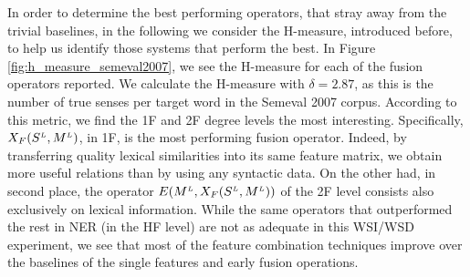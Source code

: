 In order to determine the best performing operators, that stray away from the trivial baselines, in the following we consider the H-measure, introduced before, to help us identify those systems that perform the best. In Figure \ref{fig:h_measure_semeval2007}, we see the H-measure for each of the fusion operators reported. We calculate the H-measure with $\delta=2.87$, as this is the number of true senses per target word in the Semeval 2007 corpus.  According to this metric, we find the 1F and 2F degree  levels the most interesting. Specifically, $X_F(S^{\scriptscriptstyle L},M^{\scriptscriptstyle L})$, in 1F, is the most performing fusion operator. Indeed, by transferring quality lexical similarities into its same feature matrix, we obtain more useful relations than by using any syntactic data.
On the other had, in second place, the operator $E(M^{\scriptscriptstyle L},X_F(S^{\scriptscriptstyle L},M^{\scriptscriptstyle L}))$ of the 2F level consists also exclusively on lexical information. While the same operators that outperformed the rest in NER (in the HF level) are not as adequate in this WSI/WSD experiment, we see that most of the feature combination techniques improve over the baselines of the single features and early fusion operations. 


